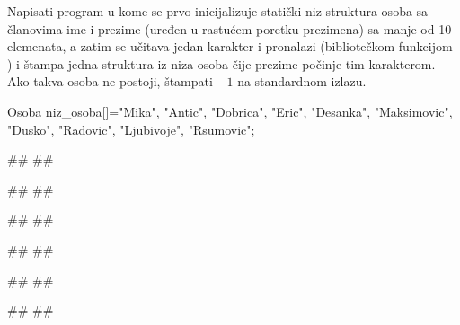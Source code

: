\begin{Exercise}[label=411]
  Napisati program u kome se prvo inicijalizuje statički niz struktura
  osoba sa članovima ime i prezime (uređen u rastućem poretku
  prezimena) sa manje od 10 elemenata, a zatim se učitava jedan
  karakter i pronalazi (bibliotečkom funkcijom ) i
  štampa jedna struktura iz niza osoba čije prezime počinje tim
  karakterom. Ako takva osoba ne postoji, štampati $-1$ na standardnom
  izlazu.
\begin{ckod}
Osoba niz_osoba[]={{"Mika", "Antic"},
                   {"Dobrica", "Eric"},
                   {"Desanka", "Maksimovic"},
                   {"Dusko", "Radovic"},
                   {"Ljubivoje", "Rsumovic"}};
\end{ckod}
  
\begin{minitest}
\begin{test}{1}
#\naslovUlaz#
##
  
#\naslovIzlaz#
##
\end{test}
\end{minitest}
\begin{minitest}
\begin{test}{2}
#\naslovUlaz#
##
  
#\naslovIzlaz#
##
\end{test}
\end{minitest}
\begin{minitest}
\begin{test}{3}
#\naslovUlaz#
##
  
#\naslovIzlaz#
##
\end{test}
\end{minitest}


\end{Exercise}





